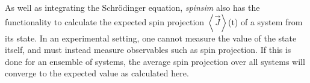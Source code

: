 \documentclass{jors}
\begin{document}

		
		As well as integrating the Schr\"odinger equation, \emph{spinsim} also has the functionality to calculate the expected spin projection \(\left\langle \overrightarrow{J}\right\rangle\)(t) of a system from its state.
		In an experimental setting, one cannot measure the value of the state itself, and must instead measure observables such as spin projection.
		If this is done for an ensemble of systems, the average spin projection over all systems will converge to the expected value as calculated here.
		
\end{document}
